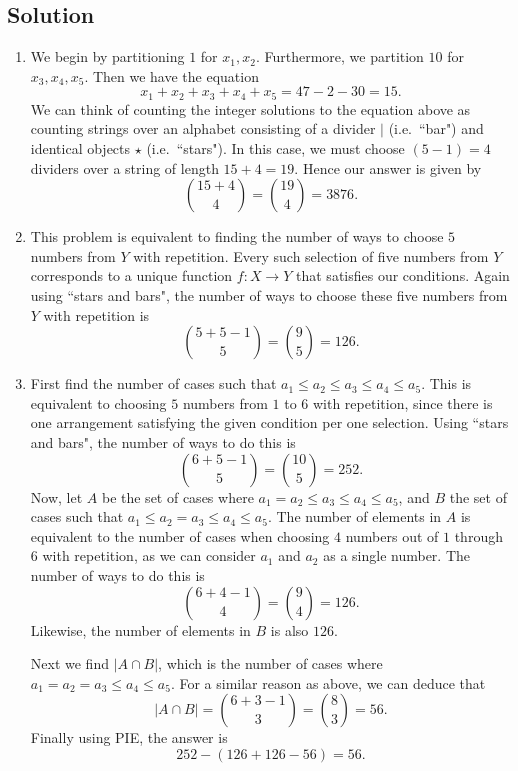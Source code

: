 \documentclass{article}
\begin{document}
\subsection*{Solution}
    \begin{enumerate}
        \item We begin by partitioning $1$ for $x_{1}, x_{2}$. Furthermore, we partition $10$ for $x_{3}, x_{4}, x_{5}$. Then we have the equation $$x_{1} + x_{2} + x_{3} + x_{4} + x_{5} = 47 - 2 - 30 = 15.$$ We can think of counting the integer solutions to the equation above as counting strings over an alphabet consisting of a divider $|$ (i.e.\ ``bar") and identical objects $\star$ (i.e.\ ``stars"). In this case, we must choose $(5 - 1) = 4$ dividers over a string of length $15 + 4 = 19$. Hence our answer is given by $$\binom{15 + 4}{4} = \binom{19}{4} = 3876.$$
        \item This problem is equivalent to finding the number of ways to choose $5$ numbers from $Y$ with repetition. Every such selection of five numbers from $Y$ corresponds to a unique function $f \colon X \rightarrow Y$ that satisfies our conditions. Again using ``stars and bars", the number of ways to choose these five numbers from $Y$ with repetition is $$\binom{5 + 5 - 1}{5} = \binom{9}{5} = 126.$$
        \item First find the number of cases such that $a_{1} \le a_{2} \le a_{3} \le a_{4} \le a_{5}$. This is equivalent to choosing $5$ numbers from $1$ to $6$ with repetition, since there is one arrangement satisfying the given condition per one selection. Using ``stars and bars", the number of ways to do this is $$\binom{6 + 5 - 1}{5} = \binom{10}{5} = 252.$$ Now, let $A$ be the set of cases where $a_{1} = a_{2} \le a_{3} \le a_{4} \le a_{5}$, and $B$ the set of cases such that $a_{1} \le a_{2} = a_{3} \le a_{4} \le a_{5}$. The number of elements in $A$ is equivalent to the number of cases when choosing $4$ numbers out of $1$ through $6$ with repetition, as we can consider $a_{1}$ and $a_{2}$ as a single number. The number of ways to do this is $$\binom{6 + 4 - 1}{4} = \binom{9}{4} = 126.$$ Likewise, the number of elements in $B$ is also $126$.
        
        \vspace{1.5mm}
        Next we find $|A \cap B|$, which is the number of cases where $a_{1} = a_{2} = a_{3} \le a_{4} \le a_{5}$. For a similar reason as above, we can deduce that $$|A \cap B| = \binom{6 + 3 - 1}{3} = \binom{8}{3} = 56.$$ Finally using PIE, the answer is $$252 - (126 + 126 - 56) = 56.$$
    \end{enumerate}
\end{document}
